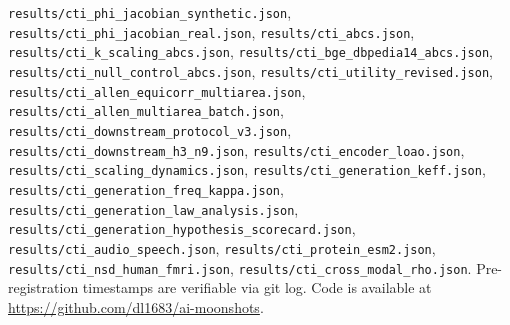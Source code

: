 \documentclass{article}
\begin{document}
\texttt{results/cti\_phi\_jacobian\_synthetic.json}, \texttt{results/cti\_phi\_jacobian\_real.json}, \texttt{results/cti\_abcs.json}, \texttt{results/cti\_k\_scaling\_abcs.json}, \texttt{results/cti\_bge\_dbpedia14\_abcs.json}, \texttt{results/cti\_null\_control\_abcs.json}, \texttt{results/cti\_utility\_revised.json}, \texttt{results/cti\_allen\_equicorr\_multiarea.json}, \texttt{results/cti\_allen\_multiarea\_batch.json}, \texttt{results/cti\_downstream\_protocol\_v3.json}, \texttt{results/cti\_downstream\_h3\_n9.json}, \texttt{results/cti\_encoder\_loao.json}, \texttt{results/cti\_scaling\_dynamics.json}, \texttt{results/cti\_generation\_keff.json}, \texttt{results/cti\_generation\_freq\_kappa.json}, \texttt{results/cti\_generation\_law\_analysis.json}, \texttt{results/cti\_generation\_hypothesis\_scorecard.json}, \texttt{results/cti\_audio\_speech.json}, \texttt{results/cti\_protein\_esm2.json}, \texttt{results/cti\_nsd\_human\_fmri.json}, \texttt{results/cti\_cross\_modal\_rho.json}. Pre-registration timestamps are verifiable via git log. Code is available at \url{https://github.com/dl1683/ai-moonshots}.
\end{document}
